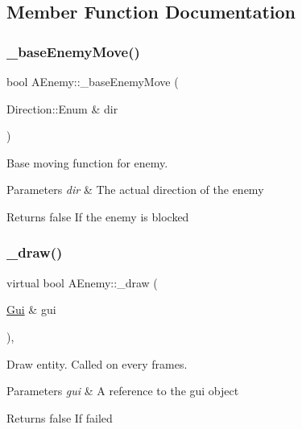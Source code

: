 \subsection{Member Function Documentation}
\mbox{\label{class_a_enemy_aff49d7d4a833983ede184276ebf93b67}} 
\subsubsection{\texorpdfstring{\+\_\+base\+Enemy\+Move()}{\_baseEnemyMove()}}
{\footnotesize\ttfamily bool A\+Enemy\+::\+\_\+base\+Enemy\+Move (\begin{DoxyParamCaption}\item[{Direction\+::\+Enum \&}]{dir }\end{DoxyParamCaption})\hspace{0.3cm}{\ttfamily [protected]}}



Base moving function for enemy. 


\begin{DoxyParams}{Parameters}
{\em dir} & The actual direction of the enemy \\
\hline
\end{DoxyParams}
\begin{DoxyReturn}{Returns}
false If the enemy is blocked 
\end{DoxyReturn}
\mbox{\label{class_a_enemy_a70e3638b5ed8ecea2a087ffe16510dd2}} 
\subsubsection{\texorpdfstring{\+\_\+draw()}{\_draw()}}
{\footnotesize\ttfamily virtual bool A\+Enemy\+::\+\_\+draw (\begin{DoxyParamCaption}\item[{\hyperlink{class_gui}{Gui} \&}]{gui }\end{DoxyParamCaption})\hspace{0.3cm}{\ttfamily [protected]}, {}}



Draw entity. Called on every frames. 


\begin{DoxyParams}{Parameters}
{\em gui} & A reference to the gui object \\
\hline
\end{DoxyParams}
\begin{DoxyReturn}{Returns}
false If failed 
\end{DoxyReturn}


